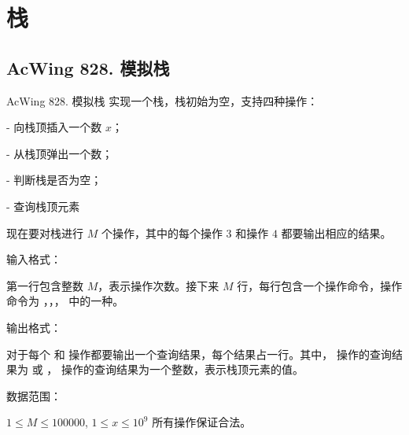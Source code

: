 \section{栈}

\subsection{AcWing 828. 模拟栈}
\begin{titledbox}{AcWing 828. 模拟栈}
    实现一个栈，栈初始为空，支持四种操作：

    \begin{myenum}
        \item {} - 向栈顶插入一个数 $x$；
        \item {} - 从栈顶弹出一个数；
        \item {} - 判断栈是否为空；
        \item {} - 查询栈顶元素
    \end{myenum}

    现在要对栈进行 $M$ 个操作，其中的每个操作 $3$ 和操作 $4$ 都要输出相应的结果。

    输入格式：

    第一行包含整数 $M$，表示操作次数。接下来 $M$ 行，每行包含一个操作命令，操作命令为 ，，， 中的一种。

    输出格式：

    对于每个  和  操作都要输出一个查询结果，每个结果占一行。其中， 操作的查询结果为  或 ， 操作的查询结果为一个整数，表示栈顶元素的值。

    数据范围：

    $1 \le M \le 100000$, $1 \le x \le 10^9$ 所有操作保证合法。

    \begin{inputblock}
         \\
         \\
         \\
         \\
         \\
         \\
         \\
         \\
         \\
         \\
    \end{inputblock}
    \begin{outputblock}
         \\
         \\
         \\
         \\
    \end{outputblock}
\end{titledbox}

